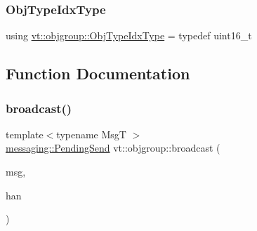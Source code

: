 \mbox{\label{namespacevt_1_1objgroup_a378e4b966221779c74f3a2f921eb2421}} 
\subsubsection{\texorpdfstring{Obj\+Type\+Idx\+Type}{ObjTypeIdxType}}
{\footnotesize\ttfamily using \hyperlink{namespacevt_1_1objgroup_a378e4b966221779c74f3a2f921eb2421}{vt\+::objgroup\+::\+Obj\+Type\+Idx\+Type} = typedef uint16\+\_\+t}



\subsection{Function Documentation}
\mbox{\label{namespacevt_1_1objgroup_a1986e4cf0b0e869e44860cd1d98196e7}} 
\subsubsection{\texorpdfstring{broadcast()}{broadcast()}}
{\footnotesize\ttfamily template$<$typename MsgT $>$ \\
\hyperlink{structvt_1_1messaging_1_1_pending_send}{messaging\+::\+Pending\+Send} vt\+::objgroup\+::broadcast (\begin{DoxyParamCaption}\item[{\hyperlink{namespacevt_ab2b3d506ec8e8d1540aede826d84a239}{Msg\+Shared\+Ptr}$<$ MsgT $>$}]{msg,  }\item[{\hyperlink{namespacevt_af64846b57dfcaf104da3ef6967917573}{Handler\+Type}}]{han }\end{DoxyParamCaption})}

\mbox{\label{namespacevt_1_1objgroup_ad45be555d5ff3bd308e8f61e4e2dd909}} 
